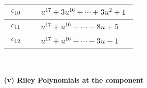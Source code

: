 \documentclass[1p]{elsarticle_modified}
\theoremstyle{definition}
\begin{document}
\begin{tabular}{m{50pt}|m{274pt}}
\hline $$\begin{aligned}c_{10}\end{aligned}$$&$\begin{aligned}
&u^{17}+3 u^{16}+\cdots+3 u^2+1
\end{aligned}$\\
\hline $$\begin{aligned}c_{11}\end{aligned}$$&$\begin{aligned}
&u^{17}+u^{16}+\cdots-8 u+5
\end{aligned}$\\
\hline $$\begin{aligned}c_{12}\end{aligned}$$&$\begin{aligned}
&u^{17}+u^{16}+\cdots-3 u-1
\end{aligned}$\\
\hline
\end{tabular}\\~\\
\newpage\renewcommand{\arraystretch}{1}
\flushleft \textbf{(v) Riley Polynomials at the component}\newline \\
\end{document}
